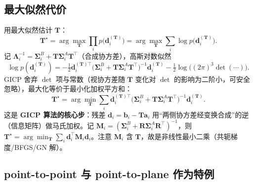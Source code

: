 \subsection{最大似然代价}
\label{sec:pc-gicp-mle}

\begin{derivation}
用最大似然估计 $\mathbf{T}$：
\begin{equation}
  \mathbf{T}^\star=\arg\max_{\mathbf{T}}\prod_i p\big(\mathbf{d}_i^{(\mathbf{T})}\big)
  =\arg\max_{\mathbf{T}}\sum_i\log p\big(\mathbf{d}_i^{(\mathbf{T})}\big).
\end{equation}
记 $\boldsymbol{\Lambda}_i^{-1}=\boldsymbol{\Sigma}_i^B+\mathbf{T}\boldsymbol{\Sigma}_i^A\mathbf{T}^\top$（合成协方差），高斯对数似然
\begin{equation}
  \log p(\mathbf{d}_i^{(\mathbf{T})})=-\tfrac12\mathbf{d}_i^{(\mathbf{T})\top}\big(\boldsymbol{\Sigma}_i^B+\mathbf{T}\boldsymbol{\Sigma}_i^A\mathbf{T}^\top\big)^{-1}\mathbf{d}_i^{(\mathbf{T})}-\tfrac12\log\!\big((2\pi)^3\det(\cdots)\big).
\end{equation}
GICP 舍弃 $\det$ 项与常数（视协方差随 $\mathbf{T}$ 变化对 $\det$ 的影响为二阶小，可安全忽略），最大化等价于最小化加权平方和：
\begin{equation}
  \boxed{\ \mathbf{T}^\star=\arg\min_{\mathbf{T}}\sum_i\mathbf{d}_i^{(\mathbf{T})\top}\Big(\boldsymbol{\Sigma}_i^B+\mathbf{T}\boldsymbol{\Sigma}_i^A\mathbf{T}^\top\Big)^{-1}\mathbf{d}_i^{(\mathbf{T})}.\ }
  \label{eq:pc-gicp-cost}
\end{equation}
这是 \textbf{GICP 算法的核心步}：残差 $\mathbf{d}_i=\mathbf{b}_i-\mathbf{T}\mathbf{a}_i$ 用“两侧协方差经变换合成”的逆（信息矩阵）做马氏加权。记 $\mathbf{M}_i=(\boldsymbol{\Sigma}_i^B+\mathbf{R}\boldsymbol{\Sigma}_i^A\mathbf{R}^\top)^{-1}$，则 $\mathbf{T}^\star=\arg\min_{\mathbf{T}}\sum_i\mathbf{d}_i^\top\mathbf{M}_i\mathbf{d}_i$。注意 $\mathbf{M}_i$ 含 $\mathbf{T}$，故是非线性最小二乘（共轭梯度/BFGS/GN 解）。
\end{derivation}

\subsection{point-to-point 与 point-to-plane 作为特例}
\label{sec:pc-gicp-special}

